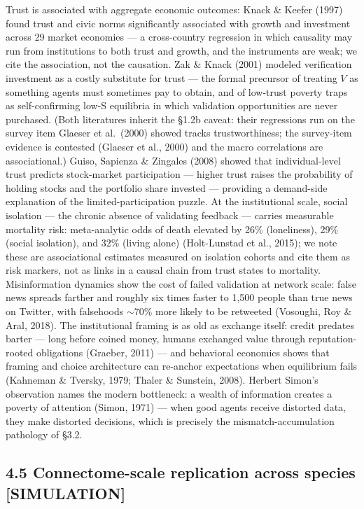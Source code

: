 \documentclass[
]{article}
\begin{document}
Trust is associated with aggregate economic outcomes: Knack \& Keefer
(1997) found trust and civic norms significantly associated with growth
and investment across 29 market economies --- a cross-country regression
in which causality may run from institutions to both trust and growth,
and the instruments are weak; we cite the association, not the
causation. Zak \& Knack (2001) modeled verification investment as a
costly substitute for trust --- the formal precursor of treating \(V\)
as something agents must sometimes pay to obtain, and of low-trust
poverty traps as self-confirming low-S equilibria in which validation
opportunities are never purchased. (Both literatures inherit the §1.2b
caveat: their regressions run on the survey item Glaeser et al.~(2000)
showed tracks trustworthiness; the survey-item evidence is contested
(Glaeser et al., 2000) and the macro correlations are associational.)
Guiso, Sapienza \& Zingales (2008) showed that individual-level trust
predicts stock-market participation --- higher trust raises the
probability of holding stocks and the portfolio share invested ---
providing a demand-side explanation of the limited-participation puzzle.
At the institutional scale, social isolation --- the chronic absence of
validating feedback --- carries measurable mortality risk: meta-analytic
odds of death elevated by 26\% (loneliness), 29\% (social isolation),
and 32\% (living alone) (Holt-Lunstad et al., 2015); we note these are
associational estimates measured on isolation cohorts and cite them as
risk markers, not as links in a causal chain from trust states to
mortality. Misinformation dynamics show the cost of failed validation at
network scale: false news spreads farther and roughly six times faster
to 1,500 people than true news on Twitter, with falsehoods \(\sim70\%\)
more likely to be retweeted (Vosoughi, Roy \& Aral, 2018). The
institutional framing is as old as exchange itself: credit predates
barter --- long before coined money, humans exchanged value through
reputation-rooted obligations (Graeber, 2011) --- and behavioral
economics shows that framing and choice architecture can re-anchor
expectations when equilibrium fails (Kahneman \& Tversky, 1979; Thaler
\& Sunstein, 2008). Herbert Simon's observation names the modern
bottleneck: a wealth of information creates a poverty of attention
(Simon, 1971) --- when good agents receive distorted data, they make
distorted decisions, which is precisely the mismatch-accumulation
pathology of §3.2.

\subsection{4.5 Connectome-scale replication across species
{[}SIMULATION{]}}\label{connectome-scale-replication-across-species-simulation}
\end{document}

